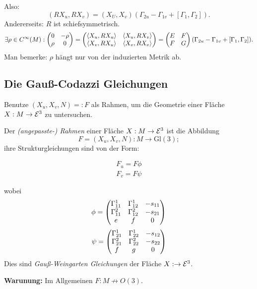 	Also: 
		\[ (RX_u,RX_v) = ( X_U,X_v )(\Gamma_{2u}-\Gamma_{1v} + [\Gamma_{1},\Gamma_{2}]). \]
	Andererseits: $R$ ist schiefsymmetrisch.
		\[ \exists \rho \in C^\infty(M): \begin{pmatrix} 0 & -\rho \\ \rho & 0 \end{pmatrix} = \begin{pmatrix} \left \langle X_u,RX_u \right\rangle &\left \langle X_u,RX_v \right\rangle \\ \left \langle X_v,RX_u \right\rangle & \left \langle X_v,RX_v \right\rangle  \end{pmatrix} = \begin{pmatrix} E & F \\ F & G \end{pmatrix}(\Gamma_{2u}-\Gamma_{1v} + [ \Gamma_{1},\Gamma_{2} ]). \]
	Man bemerke:
	$ \rho $ hängt nur von der induzierten Metrik ab.
	
\subsection{Die Gauß-Codazzi Gleichungen}

	Benutze $ (X_u,X_v,N) =: F $ als Rahmen, um die Geometrie einer Fläche $ X:M\rightarrow\mathcal E^3 $ zu untersuchen.

\begin{lemma, definition}
	
	Der \emph{(angepasste-) Rahmen} einer Fläche $ X: M \rightarrow \mathcal E^3 $ ist die Abbildung
		\[ F = (X_u,X_v,N): M \rightarrow \mathrm{Gl}(3); \]
	ihre Strukturgleichungen sind von der Form:
		
		\begin{equation}
			\begin{split}
				F_u = F \phi \\ 
				F_v = F \psi
			\end{split}
		\end{equation}
		
	wobei 
		\[ \phi = \begin{pmatrix} \Gamma_{11}^1 & \Gamma_{12}^1 & -s_{11} \\ \Gamma_{11}^2 & \Gamma_{12}^2 & -s_{21} \\ e & f & 0 \end{pmatrix} \]
		\[ \psi = \begin{pmatrix} \Gamma_{21}^1 &\Gamma_{22}^1 & -s_{12} \\ \Gamma_{21}^2 &\Gamma_{22}^2 & -s_{22} \\ f & g & 0  \end{pmatrix} \]
	Dies sind \emph{Gauß-Weingarten Gleichungen} der Fläche $ X : \rightarrow \mathcal E^3 $.
\end{lemma, definition}

\textbf{Warunung:} Im Allgemeinen $ F: M \not \rightarrow O(3). $

